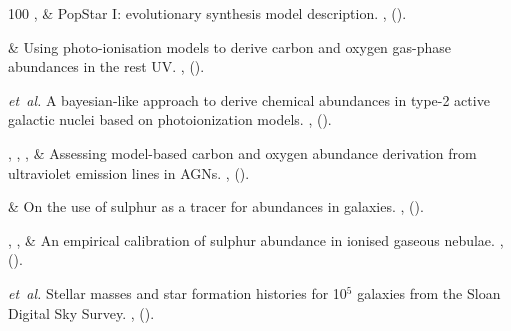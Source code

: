 \documentclass{nature2}
\begin{document}
\begin{thebibliography}{100}
,
 \&
\newblock PopStar I: evolutionary synthesis model description.
\newblock \emph{} \textbf{},
 ().

 \&
\newblock Using photo-ionisation models to derive carbon and oxygen gas-phase abundances in the rest UV.
\newblock \emph{} \textbf{},
 ().

\emph{et~al.}
\newblock A bayesian-like approach to derive chemical abundances in type-2 active galactic nuclei based on photoionization models.
\newblock \emph{} \textbf{},
 ().

, ,
, 
 \&
\newblock Assessing model-based carbon and oxygen abundance derivation from ultraviolet emission lines in AGNs.
\newblock \emph{} \textbf{},
 ().

 \&
\newblock On the use of sulphur as a tracer for abundances in galaxies.
\newblock \emph{} \textbf{},
 ().

, , 
 \&
\newblock An empirical calibration of sulphur abundance in ionised gaseous nebulae.
\newblock \emph{} \textbf{},
 ().

\emph{et~al.}
\newblock Stellar masses and star formation histories for 10\ensuremath{^{5}} galaxies from the Sloan Digital Sky Survey.
\newblock \emph{} \textbf{},
 ().


\end{thebibliography}
\end{document}
